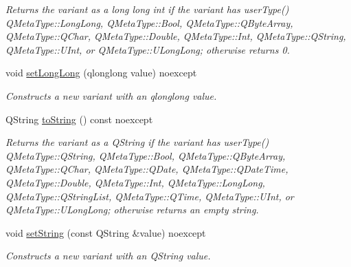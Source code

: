 \begin{DoxyCompactItemize}
\begin{DoxyCompactList}\small\item\em Returns the variant as a long long int if the variant has user\+Type() Q\+Meta\+Type\+::\+Long\+Long, Q\+Meta\+Type\+::\+Bool, Q\+Meta\+Type\+::\+Q\+Byte\+Array, Q\+Meta\+Type\+::\+Q\+Char, Q\+Meta\+Type\+::\+Double, Q\+Meta\+Type\+::\+Int, Q\+Meta\+Type\+::\+Q\+String, Q\+Meta\+Type\+::\+U\+Int, or Q\+Meta\+Type\+::\+U\+Long\+Long; otherwise returns 0. \end{DoxyCompactList}\item 
\mbox{\label{class_variant_a415098d546cf5f269de7ef5c5c438304}} 
void \hyperlink{class_variant_a415098d546cf5f269de7ef5c5c438304}{set\+Long\+Long} (qlonglong value) noexcept
\begin{DoxyCompactList}\small\item\em Constructs a new variant with an qlonglong value. \end{DoxyCompactList}\item 
\mbox{\label{class_variant_a40530eedbdc0f3bad04df67febbc09de}} 
Q\+String \hyperlink{class_variant_a40530eedbdc0f3bad04df67febbc09de}{to\+String} () const noexcept
\begin{DoxyCompactList}\small\item\em Returns the variant as a Q\+String if the variant has user\+Type() Q\+Meta\+Type\+::\+Q\+String, Q\+Meta\+Type\+::\+Bool, Q\+Meta\+Type\+::\+Q\+Byte\+Array, Q\+Meta\+Type\+::\+Q\+Char, Q\+Meta\+Type\+::\+Q\+Date, Q\+Meta\+Type\+::\+Q\+Date\+Time, Q\+Meta\+Type\+::\+Double, Q\+Meta\+Type\+::\+Int, Q\+Meta\+Type\+::\+Long\+Long, Q\+Meta\+Type\+::\+Q\+String\+List, Q\+Meta\+Type\+::\+Q\+Time, Q\+Meta\+Type\+::\+U\+Int, or Q\+Meta\+Type\+::\+U\+Long\+Long; otherwise returns an empty string. \end{DoxyCompactList}\item 
\mbox{\label{class_variant_a0ca6fc641562de93db2490eb2a1e7d0e}} 
void \hyperlink{class_variant_a0ca6fc641562de93db2490eb2a1e7d0e}{set\+String} (const Q\+String \&value) noexcept
\begin{DoxyCompactList}\small\item\em Constructs a new variant with an Q\+String value. \end{DoxyCompactList}\end{DoxyCompactItemize}
